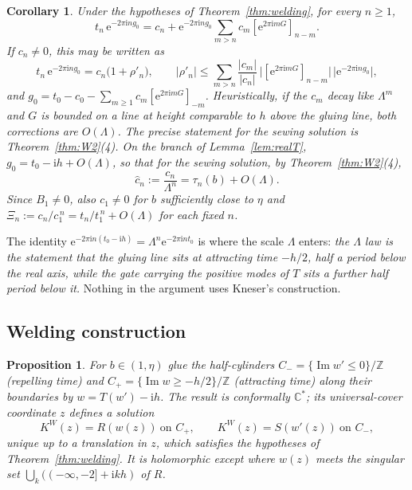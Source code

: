 \documentclass[11pt]{amsart}
\newtheorem{proposition}[theorem]{Proposition}
\newtheorem{corollary}[theorem]{Corollary}
\theoremstyle{definition}
\newcommand{\Rr}{R}
\newcommand{\Kk}{K}
\newcommand{\eee}{\mathrm{e}}
\newcommand{\ii}{\mathrm{i}}
\begin{document}
\begin{corollary}\label{cor:cn}
Under the hypotheses of Theorem~\ref{thm:welding}, for every $n\ge1$,
\[
 t_n\,\eee^{-2\pi\ii ng_0}
 =c_n+\eee^{-2\pi\ii ng_0}
   \sum_{m>n}c_m[\eee^{2\pi\ii mG}]_{n-m}.
\]
If $c_n\ne0$, this may be written as
\[
 t_n\,\eee^{-2\pi\ii ng_0}=c_n\bigl(1+\rho'_n\bigr),\qquad
 |\rho'_n|\le\sum_{m>n}\frac{|c_m|}{|c_n|}\,
 \bigl|[\eee^{2\pi\ii mG}]_{n-m}\bigr|\,\bigl|\eee^{-2\pi\ii ng_0}\bigr|,
\]
and $g_0=t_0-c_0-\sum_{m\ge1}c_m[\eee^{2\pi\ii mG}]_{-m}$.  Heuristically, if the
$c_m$ decay like $\Lambda^m$ and $G$ is bounded on a line at height comparable to
$h$ above the gluing line, both corrections are $O(\Lambda)$.  The precise
statement for the sewing solution is Theorem~\ref{thm:W2}(4).  On the
branch of Lemma~\ref{lem:realT}, $g_0=t_0-\ii h+O(\Lambda)$, so that
for the sewing solution, by Theorem~\ref{thm:W2}(4),
\begin{equation}\label{eq:chat-tau}
 \hat c_n:=\frac{c_n}{\Lambda^n}=\tau_n(b)+O(\Lambda).
\end{equation}
Since $B_1\ne0$, also $c_1\ne0$ for $b$ sufficiently close to $\eta$ and
$\Xi_n:=c_n/c_1^{\,n}=t_n/t_1^{\,n}+O(\Lambda)$ for each fixed $n$.
\end{corollary}

The identity $\eee^{-2\pi\ii n(t_0-\ii h)}=\Lambda^n\eee^{-2\pi\ii nt_0}$
is where the scale $\Lambda$ enters: \emph{the $\Lambda$ law is the statement
that the gluing line sits at attracting time $-h/2$, half a period below the
real axis, while the gate carrying the positive modes of $T$ sits a further
half period below it.}  Nothing in the argument uses Kneser's construction.

\subsection{Welding construction}

\begin{proposition}\label{prop:weld}
For $b\in(1,\eta)$ glue the half-cylinders
$C_-=\{\operatorname{Im}w'\le0\}/\mathbb Z$ (repelling time) and
$C_+=\{\operatorname{Im}w\ge-h/2\}/\mathbb Z$ (attracting time) along their
boundaries by $w=T(w')-\ii h$.  The result is conformally $\mathbb C^*$; its
universal-cover coordinate $z$ defines a solution
\[
 \Kk^{W}(z)=\Rr(w(z))\ \text{on }C_+,\qquad \Kk^{W}(z)=S(w'(z))\ \text{on }C_-,
\]
unique up to a translation in $z$, which satisfies the hypotheses of
Theorem~\ref{thm:welding}.  It is holomorphic except where $w(z)$ meets the
singular set $\bigcup_{k}((-\infty,-2]+\ii kh)$ of $\Rr$.
\end{proposition}
\end{document}
